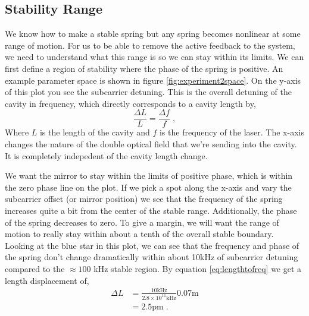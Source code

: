 \subsection{Stability Range}
\label{sec:results_stability}
We know how to make a stable spring but any spring becomes nonlinear at some
range of motion.
For us to be able to remove the active feedback to the system, we
need to understand what this range is so we can stay within its limits.
We can first define a region of stability where the phase of the spring is
positive.
An example parameter space is shown in figure \ref{fig:experiment2space}.
On the y-axis of this plot you see the subcarrier detuning. This is the
overall detuning of the cavity in frequency, which directly corresponds to
a cavity length by,
\begin{equation}
\frac{\Delta L}{L} = \frac{\Delta f}{f} \label{eq:lengthtofreq} \;,
\end{equation}
Where $L$ is the length of the cavity and $f$ is the frequency of the laser.
The x-axis changes the nature of the double optical field that we're sending
into the cavity.
It is completely indepedent of the cavity length change.

We want the mirror to stay within the limits of positive phase, which is within
the zero phase line on the plot.
If we pick a spot along the x-axis and vary the subcarrier offset
(or mirror position) we see that the frequency of the spring increases quite a
bit from the center of the stable range.
Additionally, the phase of the spring decreases to zero.
To give a margin, we will want the range of motion to really stay within about
a tenth of the overall stable boundary.
Looking at the blue star in this plot, we can see that the frequency and phase
of the spring don't change dramatically within about 10kHz of subcarrier
detuning compared to the $\approx 100$ kHz stable region. By equation
\eqref{eq:lengthtofreq} we get a length displacement of,
\begin{align}
\Delta L &= \frac{10\mathrm{kHz}}{2.8\times 10^{11}\mathrm{kHz}}
    0.07\mathrm{m} \nonumber \\
  &= 2.5 \mathrm{pm} \;.
\end{align}

